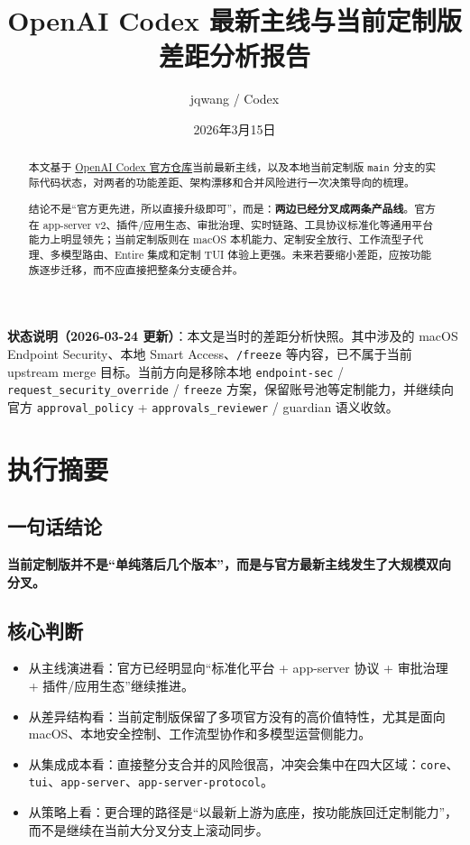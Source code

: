 \documentclass[UTF8,11pt]{ctexart}
\title{OpenAI Codex 最新主线与当前定制版差距分析报告}
\author{jqwang / Codex}
\date{2026年3月15日}
\begin{document}
\maketitle

\noindent\textbf{状态说明（2026-03-24 更新）}：本文是当时的差距分析快照。其中涉及的 macOS Endpoint Security、本地 Smart Access、\texttt{/freeze} 等内容，已不属于当前 upstream merge 目标。当前方向是移除本地 \texttt{endpoint-sec} / \texttt{request\_security\_override} / \texttt{freeze} 方案，保留账号池等定制能力，并继续向官方 \texttt{approval\_policy} + \texttt{approvals\_reviewer} / guardian 语义收敛。

\begin{abstract}
本文基于 \href{https://github.com/openai/codex}{OpenAI Codex 官方仓库}当前最新主线，以及本地当前定制版 \texttt{main} 分支的实际代码状态，对两者的功能差距、架构漂移和合并风险进行一次决策导向的梳理。

结论不是“官方更先进，所以直接升级即可”，而是：\textbf{两边已经分叉成两条产品线}。官方在 app-server v2、插件/应用生态、审批治理、实时链路、工具协议标准化等通用平台能力上明显领先；当前定制版则在 macOS 本机能力、定制安全放行、工作流型子代理、多模型路由、Entire 集成和定制 TUI 体验上更强。未来若要缩小差距，应按功能族逐步迁移，而不应直接把整条分支硬合并。
\end{abstract}

\tableofcontents
\newpage

\section{执行摘要}

\subsection{一句话结论}
\textbf{当前定制版并不是“单纯落后几个版本”，而是与官方最新主线发生了大规模双向分叉。}

\subsection{核心判断}
\begin{itemize}[nosep]
  \item 从主线演进看：官方已经明显向“标准化平台 + app-server 协议 + 审批治理 + 插件/应用生态”继续推进。
  \item 从差异结构看：当前定制版保留了多项官方没有的高价值特性，尤其是面向 macOS、本地安全控制、工作流型协作和多模型运营侧能力。
  \item 从集成成本看：直接整分支合并的风险很高，冲突会集中在四大区域：\texttt{core}、\texttt{tui}、\texttt{app-server}、\texttt{app-server-protocol}。
  \item 从策略上看：更合理的路径是“以最新上游为底座，按功能族回迁定制能力”，而不是继续在当前大分叉分支上滚动同步。
\end{itemize}
\end{document}
